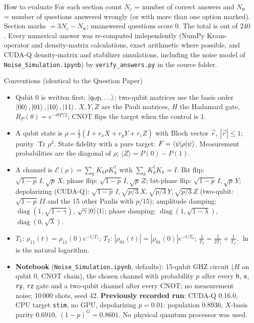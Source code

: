 \documentclass[11pt,a4paper]{article}
\begin{document}
\begin{infobox}{How to evaluate}
For each section count $N_{\mathrm c}$ = number of correct answers and $N_{\mathrm w}$ = number of questions answered wrongly (or with more than one option marked). Section marks $= 3N_{\mathrm c} - N_{\mathrm w}$; unanswered questions score $0$. The total is out of $240$.
Every numerical answer was re-computed independently (NumPy Kraus-operator and density-matrix calculations, exact arithmetic where possible, and CUDA-Q density-matrix and stabilizer simulations, including the noise model of \texttt{Noise\_Simulation.ipynb}) by
\texttt{verify\_answers.py} in the source folder.
\end{infobox}
\begin{infobox}{Conventions (identical to the Question Paper)}
\footnotesize
\begin{itemize}[leftmargin=1.2em, itemsep=1pt, topsep=2pt]
\item Qubit 0 is written first: $\ket{q_0q_1\dots}$; two-qubit matrices use the basis order $\ket{00}, \ket{01}, \ket{10}, \ket{11}$. $X, Y, Z$ are the Pauli matrices,
      $H$ the Hadamard gate, $R_P(\theta) = e^{-i\theta P/2}$; CNOT flips the target when the control is 1.
\item A qubit state is $\rho = \frac12(I + r_xX + r_yY + r_zZ)$ with Bloch vector $\vec r$, $|\vec r| \le 1$; purity $\operatorname{Tr}\rho^2$. State fidelity with a pure target:
      $F = \braket{\psi|\rho|\psi}$. Measurement probabilities are the diagonal of $\rho$; $\langle Z\rangle = P(0) - P(1)$.
\item A channel is $\mathcal E(\rho) = \sum_kK_k\rho K_k^\dagger$ with $\sum_kK_k^\dagger K_k = I$. Bit flip: $\sqrt{1-p}\,I, \sqrt p\,X$; phase flip: $\sqrt{1-p}\,I, \sqrt p\,Z$;
      bit-phase flip: $\sqrt{1-p}\,I, \sqrt p\,Y$; depolarizing (CUDA-Q): $\sqrt{1-p}\,I, \sqrt{p/3}\,X, \sqrt{p/3}\,Y, \sqrt{p/3}\,Z$ (two-qubit: $\sqrt{1-p}\,II$ and the 15
      other Paulis with $p/15$); amplitude damping: $\operatorname{diag}(1, \sqrt{1-\gamma})$, $\sqrt\gamma\ket0\!\bra1$; phase damping: $\operatorname{diag}(1, \sqrt{1-\lambda})$, $\operatorname{diag}(0, \sqrt\lambda)$.
\item $T_1$: $\rho_{11}(t) = \rho_{11}(0)e^{-t/T_1}$; $T_2$: $|\rho_{01}(t)| = |\rho_{01}(0)|e^{-t/T_2}$; $\frac1{T_2} = \frac1{2T_1} + \frac1{T_\varphi}$. $\ln$ is the natural logarithm.
\item \textbf{Notebook} (\texttt{Noise\_Simulation.ipynb}, defaults): 15-qubit GHZ circuit ($H$ on qubit 0, CNOT chain), the chosen channel with probability $p$ after
      every \texttt{h}, \texttt{x}, \texttt{ry}, \texttt{rz} gate and a two-qubit channel after every CNOT; no measurement noise; 10\,000 shots, seed 42.
      \textbf{Previously recorded run}: CUDA-Q 0.16.0, CPU target \texttt{stim}, no GPU, depolarizing $p = 0.01$: population $0.8936$, $X$-basis parity $0.6910$,
      $(1-p)^G = 0.8601$. No physical quantum processor was used.
\end{itemize}
\end{infobox}
\newpage
\end{document}
